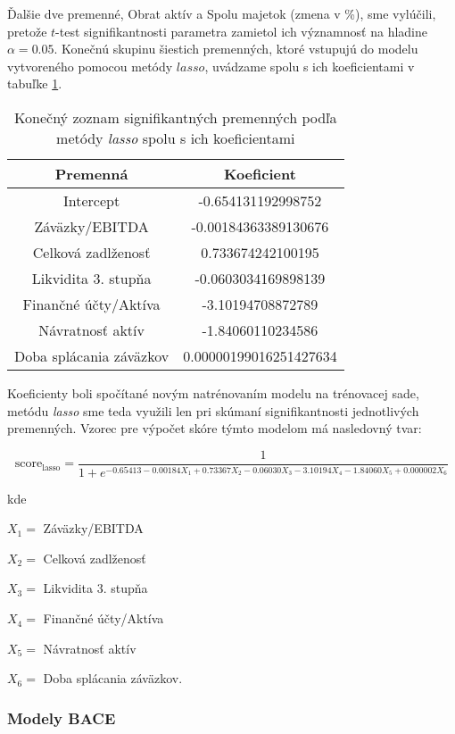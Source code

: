 Ďalšie dve premenné, Obrat aktív a Spolu majetok (zmena v \%), sme vylúčili, pretože \(t\)-test signifikantnosti parametra zamietol ich významnosť na hladine \(\alpha = 0.05\).
Konečnú skupinu šiestich premenných, ktoré vstupujú do modelu vytvoreného pomocou metódy \(lasso\), uvádzame spolu s ich koeficientami v tabuľke \ref{lasso tabulka konecne parametre}.

\begin{table}
    \begin{tabular}{ |c|c| }
        \hline
        Premenná & Koeficient \\
        \hline
        Intercept & -0.654131192998752 \\
        \hline
        Záväzky/EBITDA & -0.00184363389130676 \\
        \hline
        Celková zadlženosť & 0.733674242100195 \\
        \hline
        Likvidita 3. stupňa & -0.0603034169898139 \\
        \hline
        Finančné účty/Aktíva & -3.10194708872789 \\
        \hline
        Návratnosť aktív & -1.84060110234586 \\
        \hline
        Doba splácania záväzkov & 0.00000199016251427634 \\
        \hline
    \end{tabular}
    \caption{Konečný zoznam signifikantných premenných podľa metódy \emph{lasso} spolu s ich koeficientami}
    \label{lasso tabulka konecne parametre}
\end{table}

Koeficienty boli spočítané novým natrénovaním modelu na trénovacej sade,
metódu \emph{lasso} sme teda využili len pri skúmaní signifikantnosti jednotlivých premenných.
Vzorec pre výpočet skóre týmto modelom má nasledovný tvar:

\[
    \text{score}_\text{lasso} = \frac{1}{1 + e^{-0.65413 - 0.00184X_1 + 0.73367X_2 - 0.06030X_3 - 3.10194X_4 - 1.84060X_5 + 0.000002X_6}}
\]

kde

\(X_1 = \) Záväzky/EBITDA

\(X_2 = \) Celková zadlženosť

\(X_3 = \) Likvidita 3. stupňa

\(X_4 = \) Finančné účty/Aktíva

\(X_5 = \) Návratnosť aktív

\(X_6 = \) Doba splácania záväzkov.

\subsubsection{Modely BACE}

